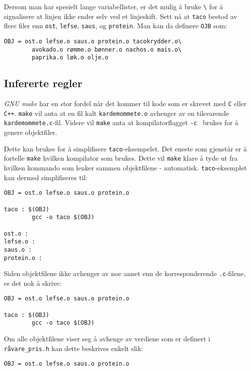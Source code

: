 \begin{alphasection}
Dersom man har spesielt lange variabellister, er det mulig å bruke \verb|\| for å signalisere at linjen ikke ender selv ved et linjeskift. Sett nå at \verb|taco| bestod av flere filer enn \verb|ost|, \verb|lefse|, \verb|saus|, og \verb|protein|. Man kan da definere \verb|OJB| som:

\begin{lstlisting}
OBJ = ost.o lefse.o saus.o protein.o tacokrydder.o\
        avokado.o rømme.o bønner.o nachos.o mais.o\
        paprika.o løk.o olje.o
\end{lstlisting}

\subsection{Infererte regler}

\textit{GNU make} har en stor fordel når det kommer til kode som er skrevet med \verb|C| eller \verb|C++|. \verb|make| vil anta at en fil kalt \verb|kardemommete.o| avhenger av en tilsvarende \verb|kardemommete.c|-fil. Videre vil \verb|make| anta at kompilatorflagget \verb|-c| \ brukes for å genere objektfiler. 

Dette kan brukes for å simplifisere \verb|taco|-eksempelet. Det eneste som gjenstår er å fortelle \verb|make| hvilken kompilator som brukes. Dette vil \verb|make| klare å tyde ut fra hvilken kommando som lenker sammen objektfilene - automatisk. \verb|taco|-eksemplet kan dermed simplifiseres til:



\begin{lstlisting}
OBJ = ost.o lefse.o saus.o protein.o

taco : $(OBJ)
        gcc -o taco $(OBJ)

ost.o :
lefse.o :
saus.o :
protein.o :
\end{lstlisting}

Siden objektfilene ikke avhenger av noe annet enn de korresponderende \verb|.c|-filene, er det nok å skrive:

\begin{lstlisting}
OBJ = ost.o lefse.o saus.o protein.o

taco : $(OBJ)
        gcc -o taco $(OBJ)
\end{lstlisting}


Om alle objektfilene viser seg å avhenge av verdiene som er definert i \texttt{råvare\_pris.h}  kan dette beskrives enkelt slik:

\begin{lstlisting}
OBJ = ost.o lefse.o saus.o protein.o


\end{lstlisting}
\end{alphasection}
